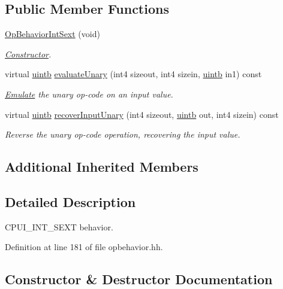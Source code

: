 \subsection*{Public Member Functions}
\begin{DoxyCompactItemize}
\item 
\mbox{\hyperlink{class_op_behavior_int_sext_af4e2aa799f6e5e883bd2c0c4c3a78754}{Op\+Behavior\+Int\+Sext}} (void)
\begin{DoxyCompactList}\small\item\em \mbox{\hyperlink{class_constructor}{Constructor}}. \end{DoxyCompactList}\item 
virtual \mbox{\hyperlink{types_8h_a2db313c5d32a12b01d26ac9b3bca178f}{uintb}} \mbox{\hyperlink{class_op_behavior_int_sext_a35e0df0f35bcf5a655310ff7476d7b77}{evaluate\+Unary}} (int4 sizeout, int4 sizein, \mbox{\hyperlink{types_8h_a2db313c5d32a12b01d26ac9b3bca178f}{uintb}} in1) const
\begin{DoxyCompactList}\small\item\em \mbox{\hyperlink{class_emulate}{Emulate}} the unary op-\/code on an input value. \end{DoxyCompactList}\item 
virtual \mbox{\hyperlink{types_8h_a2db313c5d32a12b01d26ac9b3bca178f}{uintb}} \mbox{\hyperlink{class_op_behavior_int_sext_ab4576951030123a125defa0b27d19f01}{recover\+Input\+Unary}} (int4 sizeout, \mbox{\hyperlink{types_8h_a2db313c5d32a12b01d26ac9b3bca178f}{uintb}} out, int4 sizein) const
\begin{DoxyCompactList}\small\item\em Reverse the unary op-\/code operation, recovering the input value. \end{DoxyCompactList}\end{DoxyCompactItemize}
\subsection*{Additional Inherited Members}


\subsection{Detailed Description}
C\+P\+U\+I\+\_\+\+I\+N\+T\+\_\+\+S\+E\+XT behavior. 

Definition at line 181 of file opbehavior.\+hh.



\subsection{Constructor \& Destructor Documentation}
\mbox{\label{class_op_behavior_int_sext_af4e2aa799f6e5e883bd2c0c4c3a78754}} 
